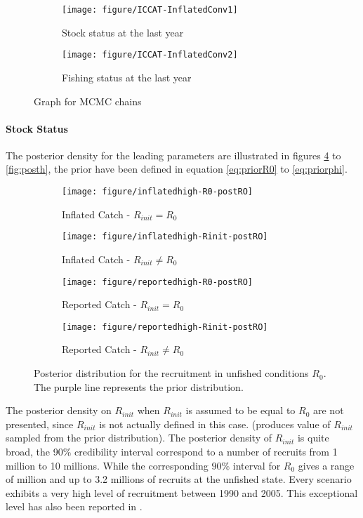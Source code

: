 \begin{figure}[htbp]
 \begin{subfigure}[b]{0.45\textwidth}
 \texttt{[image: figure/ICCAT-InflatedConv1]}
  \caption{Stock status at the last year}
                \label{fig:mcmcstock}
  \end{subfigure}
 \begin{subfigure}[b]{0.45\textwidth} 
 \texttt{[image: figure/ICCAT-InflatedConv2]}
\caption{Fishing status at the last year}
                \label{fig:mcmcfish}
  \end{subfigure}
  \caption{Graph for MCMC chains}
  \label{fig:mcmcdiag}
 \end{figure}

\paragraph{Stock Status}
The posterior density for the leading parameters are illustrated in figures \ref{fig:postR0} to \ref{fig:posth},
the prior have been defined in equation \ref{eq:priorR0} to \ref{eq:priorphi}.


\begin{figure}[htbp]
 \begin{subfigure}[b]{0.45\textwidth}
 \texttt{[image: figure/inflatedhigh-R0-postRO]}
  \caption{Inflated Catch - $R_{init}=R_0$}
  \end{subfigure} \hfill
 \begin{subfigure}[b]{0.45\textwidth} 
 \texttt{[image: figure/inflatedhigh-Rinit-postRO]}
  \caption{Inflated Catch - $R_{init}\ne R_0$}
  \end{subfigure}
 \begin{subfigure}[b]{0.45\textwidth}
 \texttt{[image: figure/reportedhigh-R0-postRO]}
  \caption{Reported Catch - $R_{init}=R_0$}
  \end{subfigure} \hfill
 \begin{subfigure}[b]{0.45\textwidth} 
 \texttt{[image: figure/reportedhigh-Rinit-postRO]}
  \caption{Reported Catch - $R_{init}\ne R_0$}
  \end{subfigure}
  \caption{Posterior distribution for the recruitment in unfished conditions $R_0$. The purple line represents the prior distribution.}
  \label{fig:postR0}
 \end{figure}

 The posterior density on $R_{init}$ when $R_{init}$ is assumed to be equal to $R_0$ are not presented, since $R_{init}$ is not actually defined in this case. (\iscam produces value of $R_{init}$ sampled from the prior distribution).
 The posterior density of $R_{init}$ is quite broad, the 90$\%$ credibility interval correspond to a number of recruits from 1 million to 10 millions.
 While the corresponding $90\%$ interval for $R_0$ gives a range of million and up to 3.2 millions of recruits at the unfished state.
 Every scenario exhibits a very high level of recruitment between 1990 and 2005. This exceptional  level has also been reported in \cite{tuna2012}.
 
